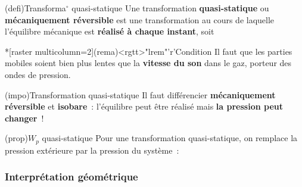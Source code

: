 \documentclass[../../main/main.tex]{subfiles}
\begin{document}
\begin{tcbraster}[raster equal height=rows, raster columns=5]
	\begin{tcb*}[raster multicolumn=3](defi){Transforma$^\circ$ quasi-statique}
		Une transformation \textbf{quasi-statique} ou \textbf{mécaniquement
			réversible} est une transformation au cours de laquelle l'équilibre mécanique
		est \textbf{réalisé à chaque instant}, soit
		\psw{%
			\[
				\boxed{P = P\ind{ext}}
			\]
		}%
		\vspace{-15pt}
	\end{tcb*}
	\begin{tcb}*[raster multicolumn=2](rema)<rgtt>"lrem"'r'{Condition}
		Il faut que les parties mobiles soient bien plus lentes que la \textbf{vitesse
			du son} dans le gaz, porteur des ondes de pression.
	\end{tcb}
\end{tcbraster}

\begin{tcb*}(impo){Transformation quasi-statique}
	Il faut différencier \textbf{mécaniquement réversible} et \textbf{isobare}~:
	l'équilibre peut être réalisé mais \textbf{la pression peut changer}~!
\end{tcb*}
\begin{tcb*}(prop){$W_p$ quasi-statique}
	Pour une transformation quasi-statique, on remplace la pression extérieure par
	la pression du système~:
	\psw{%
		\[
			\boxed{W_p = - \int_{V_i}^{V_f}P \dd{V}}
		\]
	}%
\end{tcb*}

\vspace{-15pt}
\subsubsection{Interprétation géométrique}
\end{document}
